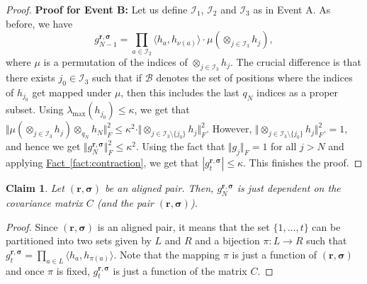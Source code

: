 \documentclass[11pt]{article}
\numberwithin{equation}{section}
\newtheorem{claim}[theorem]{Claim}
\theoremstyle{definition}
\theoremstyle{plain}
\newcommand{\expref}[2]{\hyperref[#2]{#1~\ref{#2}}}
\begin{document}
\begin{proof}
\smallskip
\noindent
\textbf{Proof for Event B: } Let us define $\mathcal{I}_1$, $\mathcal{I}_2$ and $\mathcal{I}_3$ as in Event A. As before, we have
\[
g^{\mathbf{r}, \boldsymbol{\sigma}}_{N-1} =\prod_{a \in \mathcal{I}_2} \langle h_a , h_{\nu(a)} \rangle \cdot \mu (\otimes_{j \in \mathcal{I}_3} h_j),
\]
where $\mu$ is a permutation of the indices of  $\otimes_{j \in \mathcal{I}_3} h_j$. The crucial difference is that there exists $j_0 \in \mathcal{I}_3$ such that if $\mathcal{B}$ denotes the set of positions where the indices of $h_{j_0}$ get mapped under $\mu$, then this includes the last $q_N$ indices as a proper subset. 
Using $\lambda_{\max}(h_{j_0}) \le \kappa$, we get that 
$\Vert \mu (\otimes_{j \in \mathcal{I}_3} h_{j}) \otimes_{q_N} h_N \Vert_F^2 \le \kappa^2 \cdot \Vert \otimes_{j \in \mathcal{I}_3 \setminus \{j_0\}} h_{j}\Vert_F^2. $
However, $\Vert \otimes_{j \in \mathcal{I}_3 \setminus \{j_0\}} h_{j}\Vert_F^2. =1$, and hence we get $\Vert g^{\mathbf{r}, \boldsymbol{\sigma}}_{N} \Vert_F^2 \le \kappa^2$.
 Using the fact that $\Vert g_j \Vert_F=1$ for all $j>N$ and applying \expref{Fact}{fact:contraction}, we get that $|g^{\mathbf{r}, \boldsymbol{\sigma}}_{t}|\le \kappa$. This finishes the proof.
\end{proof}

\begin{claim}
Let $(\mathbf{r}, \boldsymbol{\sigma})$ be an aligned pair. Then, $g^{\mathbf{r}, \boldsymbol{\sigma}}_{N}$ is just dependent on the covariance matrix $C$ (and the pair $(\mathbf{r}, \boldsymbol{\sigma})$). 
\end{claim}
\begin{proof}
Since $(\mathbf{r}, \boldsymbol{\sigma})$ is an aligned pair, it means that the set $\{1, \ldots, t\}$ can be partitioned into two sets given by $L$ and $R$ and a bijection $\pi : L \rightarrow R$  such that 
$g^{\mathbf{r}, \boldsymbol{\sigma}}_{t} = \prod_{a \in L} \langle h_a, h_{\pi(a)} \rangle$. Note that the mapping $\pi$ is just a function of $(\mathbf{r}, \boldsymbol{\sigma})$ and once $\pi$ is fixed, $g^{\mathbf{r}, \boldsymbol{\sigma}}_{t} $ is just a function of the matrix $C$. 
\end{proof}
\end{document}

